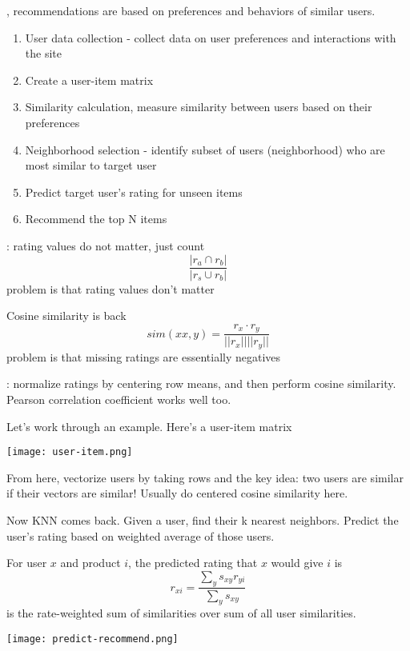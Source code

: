 \documentclass[12pt]{scrartcl}
\begin{document}
\begin{definition}
  , recommendations are based on preferences and behaviors of similar 
  users. 
  \begin{enumerate}
    \item User data collection - collect data on user preferences and interactions with the site
    \item Create a user-item matrix
    \item Similarity calculation, measure similarity between users based on their preferences
    \item Neighborhood selection - identify subset of users (neighborhood) who are most similar to target user
    \item Predict target user's rating for unseen items
    \item Recommend the top N items
  \end{enumerate}
\end{definition}

\begin{definition}
  : rating values do not matter, just count 
  \[\frac{|r_a \cap r_b|}{|r_s \cup r_b|}\]
  problem is that rating values don't matter
\end{definition}

\begin{definition}
  Cosine similarity is back
  \[sim(xx,y) = \frac{r_x \cdot r_y}{||r_x|| ||r_y||}\]
  problem is that missing ratings are essentially negatives
\end{definition}

\begin{definition}
  : normalize ratings by centering row means,  and 
  then perform cosine similarity. Pearson correlation coefficient works well too. 
\end{definition}

\begin{example}
  Let's work through an example. Here's a user-item matrix

  \texttt{[image: user-item.png]}

  From here, vectorize users by taking rows and the key idea: two users are similar 
  if their vectors are similar! Usually do centered cosine similarity here. 

  Now KNN comes back. Given a user, find their k nearest neighbors. Predict the user's rating based 
  on weighted average of those users. 

  For user $x$ and product $i$, the predicted rating that $x$ would give $i$ is 
  \[r_{xi} = \frac{\sum_y s_{xy} r_{yi}}{\sum_y s_{xy}}\]
  is the rate-weighted sum of similarities over sum of all user similarities.

  \texttt{[image: predict-recommend.png]}

\end{example}
\end{document}
